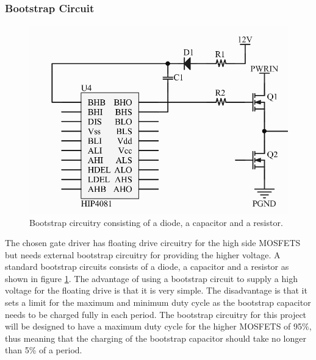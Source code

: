 \subsubsection{Bootstrap Circuit}
\label{ssub:bootstrap_circuit}
\begin{figure}[h]
	\centering
	\includegraphics[width=0.6\linewidth]{graphics/hip_bootstrap}
	\caption[Bootstrap circuitry]{Bootstrap circuitry consisting of a diode, a capacitor and a resistor. }
	\label{fig:hip_bootstrap}
\end{figure}	
The chosen gate driver has floating drive circuitry for the high side MOSFETS but needs external bootstrap circuitry for providing the higher voltage. 
A standard bootstrap circuits consists of a diode, a capacitor and a resistor as shown in figure \ref{fig:hip_bootstrap}.
The advantage of using a bootstrap circuit to supply a high voltage for the floating drive is that it is very simple. 
The disadvantage is that it sets a limit for the maximum and minimum duty cycle as the bootstrap capacitor needs to be charged fully in each period.
The bootstrap circuitry for this project will be designed to have a maximum duty cycle for the higher MOSFETS of 95\%, thus meaning that the charging of the bootstrap capacitor should take no longer than 5\% of a period.  

